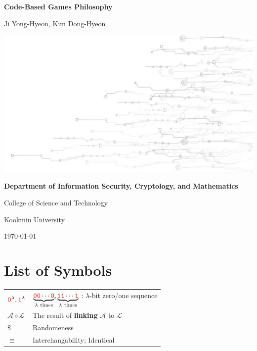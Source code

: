 \documentclass[12pt,openany]{book}
\theoremstyle{definition}
\newcommand{\library}{\mathcal{L}}
\newcommand{\zero}{\textcolor{red}{\texttt{0}}}
\newcommand{\one}{\textcolor{red}{\texttt{1}}}
\newcommand{\adversary}{\mathcal{A}}
\newcommand{\linking}{\diamond}
\newcommand{\randomness}{\$}
\begin{document}
	
	\begin{titlepage}
		\begin{center}
			{\Huge\textsf{\textbf{Code-Based Games Philosophy}}\par}
			\vspace{0.5in}
			{\Large Ji Yong-Hyeon, Kim Dong-Hyeon\par}
			\vspace{1in}
			\includegraphics[scale=2.5]{urop.jpg}\par
			\vspace{1in}
			{\bf Department of Information Security, Cryptology, and Mathematics\par}
			{College of Science and Technology\par}
			{Kookmin University\par}
			\vspace{.25in}
			{\large \today\par}
		\end{center}
	\end{titlepage}
	
	\tableofcontents
	
	\mainmatter
	
	\chapter*{List of Symbols}
	
	\begin{tabular}{ll}
		\( \zero^\lambda, \one^\lambda\) & \(\underbrace{\zero\zero\cdots\zero}_{\lambda\ \text{times}}, \underbrace{\one\one\cdots\one}_{\lambda\ \text{times}}\) : \(\lambda\)-bit zero/one sequence \\
		\( \adversary\linking\library \) & The result of \textbf{linking} $\adversary$ to  $\library$ \\
		\( \randomness \) & Randomeness \\
		\( \equiv \) & Interchangability; Identical
	\end{tabular}
	
\end{document}
